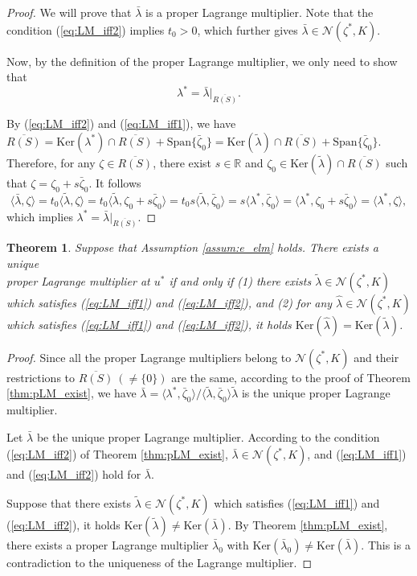 \documentclass[leqno]{amsart}
\newtheorem{theorem}{Theorem}[section]
\theoremstyle{definition}
\begin{document}
\begin{proof}
We will prove that $\bar{\lambda}$ is a proper Lagrange multiplier. Note that the  condition (\ref{eq:LM_iff2}) implies $t_0>0$, which further gives $\bar{\lambda}\in \mathcal{N}(\zeta^*,K)$. 

Now, by the definition of the proper Lagrange multiplier,  we only need to show that
$$\lambda^* = \bar{\lambda}|_{\overline{R(S)}}.$$

By  (\ref{eq:LM_iff2}) and (\ref{eq:LM_iff1}), we have $\overline{R(S)} = \mathrm{Ker}(\lambda^*)\cap \overline{R(S)} + \mathrm{Span}\{\bar{\zeta}_0\} = \mathrm{Ker}(\tilde{\lambda})\cap \overline{R(S)} + \mathrm{Span}\{\bar{\zeta}_0\}$. Therefore, for any $\zeta \in \overline{R(S)}$, there exist $s\in \mathbb{R}$ and $\zeta_0\in \mathrm{Ker}(\tilde{\lambda})\cap \overline{R(S)}$ such that $\zeta = \zeta_0 + s\bar{\zeta}_0$. It follows
$$\langle \bar{\lambda}, \zeta\rangle =  t_0 \langle \tilde{\lambda}, \zeta\rangle =  t_0 \langle \tilde{\lambda}, \zeta_0 + s\bar{\zeta}_0\rangle = t_0s\langle \tilde{\lambda}, \bar{\zeta}_0\rangle = s\langle \lambda^*, \bar{\zeta}_0\rangle =  \langle \lambda^*, \zeta_0 + s\bar{\zeta}_0\rangle = \langle \lambda^*, \zeta\rangle,$$
which implies $\lambda^* = \bar{\lambda}|_{\overline{R(S)}}.$
\end{proof}


\begin{theorem}\label{thm:pLM_unique}
Suppose that Assumption \ref{assum:e_elm} holds.
There exists a unique \\
proper Lagrange multiplier at $u^*$ if and only if (1) there exists $\tilde{\lambda}\in\mathcal{N}(\zeta^*,K)$ which satisfies (\ref{eq:LM_iff1}) and (\ref{eq:LM_iff2}), and (2) for any $\hat{\lambda}\in\mathcal{N}(\zeta^*,K)$ which satisfies (\ref{eq:LM_iff1}) and (\ref{eq:LM_iff2}),  it holds $\mathrm{Ker}(\hat{\lambda}) = \mathrm{Ker}(\tilde{\lambda})$.
\end{theorem}

\begin{proof}
Since all the proper Lagrange multipliers belong to $\mathcal{N}(\zeta^*,K)$ and their restrictions to $\overline{R(S)}\ (\neq \{0\})$ are the same, according to the proof of Theorem \ref{thm:pLM_exist}, we have $\bar{\lambda} = \langle \lambda^*, \bar{\zeta}_0\rangle/\langle \tilde{\lambda}, \bar{\zeta}_0\rangle\tilde{\lambda}$ is the unique proper Lagrange multiplier.

Let $\bar{\lambda}$ be the unique proper Lagrange multiplier. According to the condition (\ref{eq:LM_iff2}) of Theorem \ref{thm:pLM_exist}, $\bar{\lambda} \in \mathcal{N}(\zeta^*,K)$, and (\ref{eq:LM_iff1}) and (\ref{eq:LM_iff2}) hold for $\bar{\lambda}$. 

Suppose that there exists $\tilde{\lambda}\in\mathcal{N}(\zeta^*,K)$ which satisfies (\ref{eq:LM_iff1}) and (\ref{eq:LM_iff2}), it holds $\mathrm{Ker}(\tilde{\lambda}) \neq \mathrm{Ker}(\bar{\lambda})$. By Theorem \ref{thm:pLM_exist}, there exists a proper Lagrange multiplier $\bar{\lambda}_0$ with $\mathrm{Ker}(\bar{\lambda}_0)\neq \mathrm{Ker}(\bar{\lambda})$. This is a contradiction to the uniqueness of the Lagrange multiplier. 
\end{proof}
\end{document}
